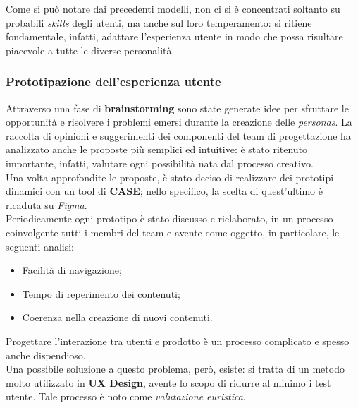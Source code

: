 \documentclass{natourDoc}
\begin{document}
Come si può notare dai precedenti modelli, non ci si è concentrati soltanto su probabili \textit{skills} degli utenti, ma anche sul loro
temperamento: si ritiene fondamentale, infatti, adattare l'esperienza utente in modo che possa risultare piacevole a tutte le diverse personalità.

\newpage
\subsubsection{Prototipazione dell'esperienza utente}
Attraverso una fase di \textbf{brainstorming} sono state generate idee per sfruttare le opportunità e risolvere i problemi emersi durante la creazione delle \textit{personas}.
La raccolta di opinioni e suggerimenti dei componenti del team di progettazione ha analizzato anche le proposte più semplici ed intuitive: è stato ritenuto importante, infatti, valutare ogni
possibilità nata dal processo creativo. \\
Una volta approfondite le proposte, è stato deciso di realizzare dei prototipi dinamici con un tool di \textbf{CASE}; nello specifico, la scelta di quest'ultimo è ricaduta su \textit{Figma}.\\

Periodicamente ogni prototipo è stato discusso e rielaborato, in un processo coinvolgente tutti i membri del team e avente come oggetto, in particolare, le seguenti analisi:
\begin{itemize}
	\item Facilità di navigazione;
	\item Tempo di reperimento dei contenuti;
	\item Coerenza nella creazione di nuovi contenuti.
\end{itemize}

Progettare l'interazione tra utenti e prodotto è un processo complicato e spesso anche dispendioso. \\
Una possibile soluzione a questo problema, però, esiste: si tratta di un metodo molto utilizzato in
\textbf{UX Design}, avente lo scopo di ridurre al minimo i test utente. Tale processo è noto come \textit{valutazione euristica}. \\
\end{document}
